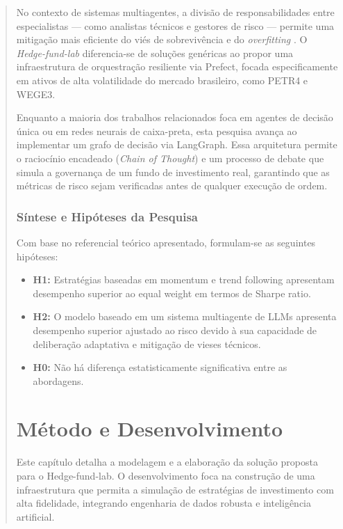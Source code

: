 \documentclass{eic-bcc-tcc}
\begin{document}
\begin{abstract}
No contexto de sistemas multiagentes, a divisão de responsabilidades entre especialistas — como analistas técnicos e gestores de risco — permite uma mitigação mais eficiente do viés de sobrevivência e do \textit{overfitting} \citep{LopezDePrado2018}. O \textit{Hedge-fund-lab} diferencia-se de soluções genéricas ao propor uma infraestrutura de orquestração resiliente via Prefect, focada especificamente em ativos de alta volatilidade do mercado brasileiro, como PETR4 e WEGE3. 

Enquanto a maioria dos trabalhos relacionados foca em agentes de decisão única ou em redes neurais de caixa-preta, esta pesquisa avança ao implementar um grafo de decisão via LangGraph. Essa arquitetura permite o raciocínio encadeado (\textit{Chain of Thought}) e um processo de debate que simula a governança de um fundo de investimento real, garantindo que as métricas de risco \citep{Bailey2014} sejam verificadas antes de qualquer execução de ordem.

\subsection{Síntese e Hipóteses da Pesquisa}

Com base no referencial teórico apresentado, formulam-se as seguintes hipóteses:

\begin{itemize}
\item \textbf{H1:} Estratégias baseadas em momentum e trend following apresentam desempenho superior ao equal weight em termos de Sharpe ratio.
\item \textbf{H2:} O modelo baseado em um sistema multiagente de LLMs apresenta desempenho superior ajustado ao risco devido à sua capacidade de deliberação adaptativa e mitigação de vieses técnicos.
\item \textbf{H0:} Não há diferença estatisticamente significativa entre as abordagens.
\end{itemize}


\chapter{Método e Desenvolvimento}
\label{cha:metodo}

Este capítulo detalha a modelagem e a elaboração da solução proposta para o Hedge-fund-lab. O desenvolvimento foca na construção de uma infraestrutura que permita a simulação de estratégias de investimento com alta fidelidade, integrando engenharia de dados robusta e inteligência artificial.


\end{abstract}
\end{document}
